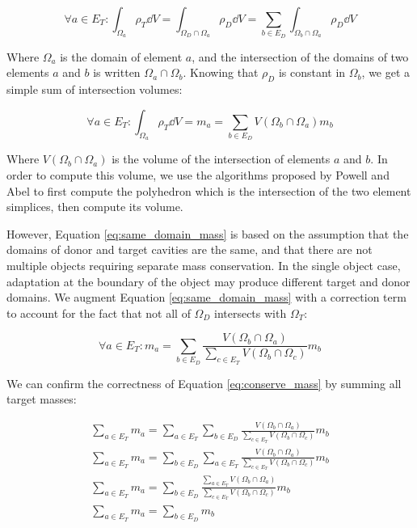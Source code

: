 \begin{equation}
\forall a \in E_T: \int_{\Omega_a} \rho_T \dd V = \int_{\Omega_D \cap \Omega_a} \rho_D \dd V
= \sum_{b \in E_D} \int_{\Omega_b \cap \Omega_a} \rho_D \dd V
\end{equation}

Where $\Omega_a$ is the domain of element $a$, and the intersection of the
domains of two elements $a$ and $b$ is written $\Omega_a \cap \Omega_b$.
Knowing that $\rho_D$ is constant in $\Omega_b$, we get a simple
sum of intersection volumes:

\begin{equation} \label{eq:same_domain_mass}
\forall a \in E_T: \int_{\Omega_a} \rho_T \dd V = m_a
= \sum_{b \in E_D} V(\Omega_b \cap \Omega_a) m_b
\end{equation}

Where $V(\Omega_b \cap \Omega_a)$ is the volume of the intersection of elements $a$ and $b$.
In order to compute this volume, we use the algorithms
proposed by Powell and Abel \cite{powell2015exact} to first compute the polyhedron
which is the intersection of the two element simplices, then compute
its volume.

However, Equation \ref{eq:same_domain_mass} is based on the assumption
that the domains of donor and target cavities are the same, and that
there are not multiple objects requiring separate mass conservation.
In the single object case, adaptation at the boundary of the object may
produce different target and donor domains.
We augment Equation \ref{eq:same_domain_mass} with a correction term
to account for the fact that not all of $\Omega_D$ intersects with $\Omega_T$:

\begin{equation} \label{eq:conserve_mass}
\forall a \in E_T: m_a
= \sum_{b \in E_D} \frac{V(\Omega_b \cap \Omega_a)}
{\sum_{c \in E_T} V(\Omega_b \cap \Omega_c)} m_b
\end{equation}

We can confirm the correctness of Equation \ref{eq:conserve_mass} by
summing all target masses:

\begin{gather*}
\sum_{a \in E_T} m_a
= \sum_{a \in E_T} \sum_{b \in E_D} \frac{V(\Omega_b \cap \Omega_a)}
{\sum_{c \in E_T} V(\Omega_b \cap \Omega_c)} m_b \\
\sum_{a \in E_T} m_a
= \sum_{b \in E_D} \sum_{a \in E_T} \frac{V(\Omega_b \cap \Omega_a)}
{\sum_{c \in E_T} V(\Omega_b \cap \Omega_c)} m_b \\
\sum_{a \in E_T} m_a
= \sum_{b \in E_D} \frac{\sum_{a \in E_T} V(\Omega_b \cap \Omega_a)}
{\sum_{c \in E_T} V(\Omega_b \cap \Omega_c)} m_b \\
\sum_{a \in E_T} m_a
= \sum_{b \in E_D} m_b \\
\end{gather*}

